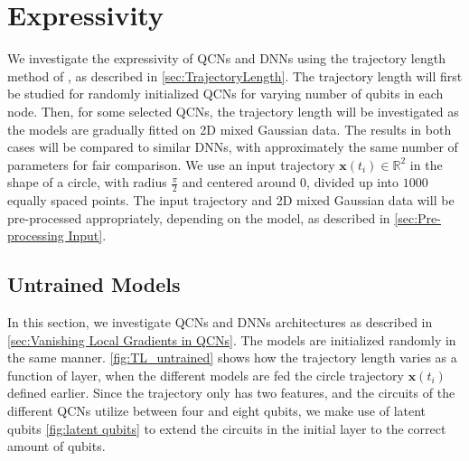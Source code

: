 \section{Expressivity}\label{sec:Expressivity}
We investigate the expressivity of QCNs and DNNs using the trajectory length method of \citet{raghu2017expressive}, as described in \autoref{sec:TrajectoryLength}. The trajectory length will first be  studied for randomly initialized QCNs for varying number of qubits in each node. Then, for some selected QCNs, the trajectory length will be investigated as the models are gradually fitted on 2D mixed Gaussian data. The results in both cases will be compared to similar DNNs, with approximately the same number of parameters for fair comparison. We use an input trajectory $\boldsymbol{x}(t_i) \in \mathbb{R}^2$ in the shape of a circle, with radius $\frac{\pi}{2}$ and centered around $0$, divided up into $1000$ equally spaced points. The input trajectory and 2D mixed Gaussian data will be pre-processed appropriately, depending on the model, as described in \autoref{sec:Pre-processing Input}. 

\subsection{Untrained Models}\label{sec:Untrained Models}

In this section, we investigate QCNs and DNNs architectures as described in \autoref{sec:Vanishing Local Gradients in QCNs}. 
The models are initialized randomly in the same manner. \autoref{fig:TL_untrained} shows how the trajectory length varies as a function of layer, when the different models are fed the circle trajectory $\boldsymbol{x}(t_i)$ defined earlier. Since the trajectory only has two features, and the circuits of the different QCNs utilize between four and eight qubits, we make use of latent qubits \autoref{fig:latent qubits} to extend the circuits in the initial layer to the correct amount of qubits.




